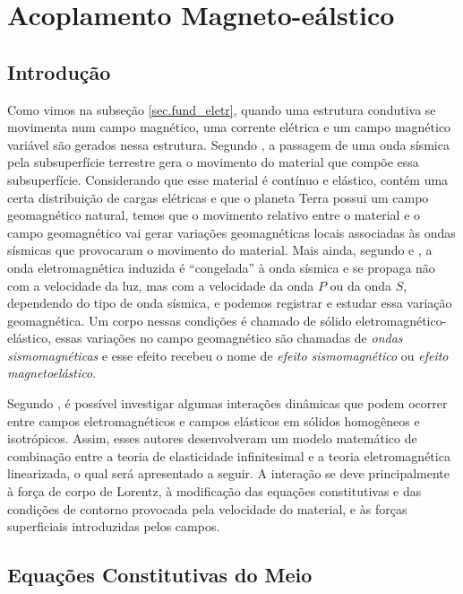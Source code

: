 \chapter{Acoplamento Magneto-e\'alstico}

\section{Introdu\c{c}\~ao}

Como vimos na subse\c{c}\~ao \ref{sec.fund_eletr}, quando uma estrutura condutiva se movimenta num campo magn\'etico, uma corrente el\'etrica e um campo magn\'etico vari\'avel s\~ao gerados nessa estrutura. Segundo \cite{Mikhailenko_1997}, a passagem de uma onda s\'ismica pela subsuperf\'icie terrestre gera o movimento do material que comp\~oe essa subsuperf\'icie. Considerando que esse material \'e cont\'inuo e el\'astico, cont\'em uma certa distribui\c{c}\~ao de cargas el\'etricas e que o planeta Terra possui um campo geomagn\'etico natural, temos que o movimento relativo entre o material e o campo geomagn\'etico vai gerar varia\c{c}\~oes geomagn\'eticas locais associadas \`as ondas s\'ismicas que provocaram o movimento do material. Mais ainda, segundo \cite{Anisimov_1985} e \cite{Sadovsky_1980}, a onda eletromagn\'etica induzida \'e ``congelada'' \`a onda s\'ismica e se propaga n\~ao com a velocidade da luz, mas com a velocidade da onda $P$ ou da onda $S$, dependendo do tipo de onda s\'ismica, e podemos registrar e estudar essa varia\c{c}\~ao geomagn\'etica.
Um corpo nessas condi\c{c}\~oes \'e chamado de s\'olido eletromagn\'etico-el\'astico, essas varia\c{c}\~oes no campo geomagn\'etico s\~ao chamadas de \textit{ondas sismomagn\'eticas} e esse efeito recebeu o nome de \textit{efeito sismomagn\'etico} ou \textit{efeito magnetoel\'astico}.

Segundo \cite{erigen_1963}, \'e poss\'ivel investigar algumas intera\c{c}\~oes din\^amicas que podem ocorrer entre campos eletromagn\'eticos e campos el\'asticos em s\'olidos homog\^eneos e isotr\'opicos. Assim, esses autores desenvolveram um modelo matem\'atico de combina\c{c}\~ao entre a teoria de elasticidade infinitesimal e a teoria eletromagn\'etica linearizada, o qual ser\'a apresentado a seguir. A intera\c{c}\~ao se deve principalmente \`a for\c{c}a de corpo de Lorentz, \`a modifica\c{c}\~ao das equa\c{c}\~oes constitutivas e das condi\c{c}\~oes de contorno provocada pela velocidade do material, e \`as for\c{c}as superficiais introduzidas pelos campos.


\section{Equa\c{c}\~oes Constitutivas do Meio}

